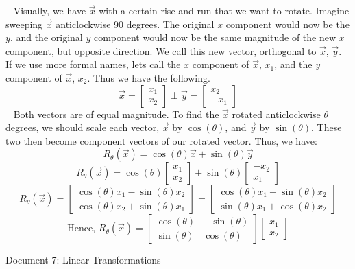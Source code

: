 \documentclass[12pt]{article}
\begin{document}
$\,\,\,$ Visually, we have $\vec{x}$ with a certain rise and run that we want to rotate. Imagine sweeping $\vec{x}$ anticlockwise 90 degrees. The original $x$ component would now be the $y$, and the original $y$ component would now be the same magnitude of the new $x$ component, but opposite direction. We call this new vector, orthogonal to $\vec{x}$, $\vec{y}$. If we use more formal names, lets call the $x$ component of $\vec{x}$, $x_1$, and the $y$ component of $\vec{x}$, $x_2$. Thus we have the following.
$$\vec{x}=\begin{bmatrix}x_1\\x_2\end{bmatrix}\perp\vec{y}=\begin{bmatrix}x_2\\-x_1\end{bmatrix}$$
$\,\,\,$ Both vectors are of equal magnitude. To find the $\vec{x}$ rotated anticlockwise $\theta$ degrees, we should scale each vector, $\vec{x}$ by $\cos(\theta)$, and $\vec{y}$ by $\sin(\theta)$. These two then become component vectors of our rotated vector. Thus, we have:
$$R_\theta (\vec{x})=\cos(\theta)\vec{x}+\sin(\theta)\vec{y}$$
$$R_\theta (\vec{x})=\cos(\theta)\begin{bmatrix}x_1\\x_2\end{bmatrix}+\sin(\theta)\begin{bmatrix}-x_2\\x_1\end{bmatrix}$$
$$R_\theta (\vec{x})=\begin{bmatrix}\cos(\theta)x_1-\sin(\theta)x_2\\\cos(\theta)x_2+\sin(\theta)x_1\end{bmatrix}=\begin{bmatrix}\cos(\theta)x_1-\sin(\theta)x_2\\\sin(\theta)x_1+\cos(\theta)x_2\end{bmatrix}$$
$$\text{Hence, } R_\theta (\vec{x})=\begin{bmatrix}\cos(\theta) & -\sin(\theta)\\\sin(\theta) & \cos(\theta)\end{bmatrix}\begin{bmatrix}x_1\\x_2\end{bmatrix}$$

\newpage
\begin{center}
Document 7: Linear Transformations
\end{center}
\end{document}
